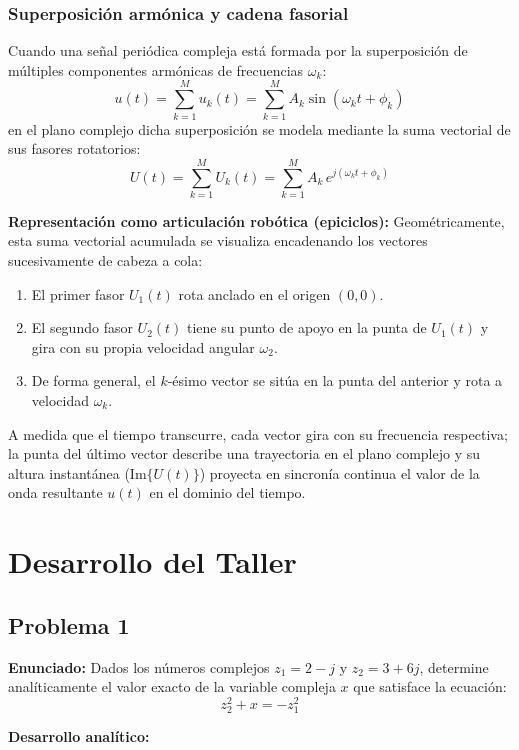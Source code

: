 \documentclass[11pt,a4paper]{article}
\begin{document}
\subsubsection{Superposición armónica y cadena fasorial}
Cuando una señal periódica compleja está formada por la superposición de múltiples componentes armónicas de frecuencias $\omega_k$:
\[
u(t) = \sum_{k=1}^M u_k(t) = \sum_{k=1}^M A_k \sin(\omega_k t + \phi_k)
\]
en el plano complejo dicha superposición se modela mediante la suma vectorial de sus fasores rotatorios:
\[
U(t) = \sum_{k=1}^M U_k(t) = \sum_{k=1}^M A_k \, e^{j(\omega_k t + \phi_k)}
\]

\textbf{Representación como articulación robótica (epiciclos):}
Geométricamente, esta suma vectorial acumulada se visualiza encadenando los vectores sucesivamente de cabeza a cola:
\begin{enumerate}
    \item El primer fasor $U_1(t)$ rota anclado en el origen $(0,0)$.
    \item El segundo fasor $U_2(t)$ tiene su punto de apoyo en la punta de $U_1(t)$ y gira con su propia velocidad angular $\omega_2$.
    \item De forma general, el $k$-ésimo vector se sitúa en la punta del anterior y rota a velocidad $\omega_k$.
\end{enumerate}
A medida que el tiempo transcurre, cada vector gira con su frecuencia respectiva; la punta del último vector describe una trayectoria en el plano complejo y su altura instantánea ($\text{Im}\{U(t)\}$) proyecta en sincronía continua el valor de la onda resultante $u(t)$ en el dominio del tiempo.


\section{Desarrollo del Taller}

\subsection{Problema 1}
\noindent\textbf{Enunciado:} Dados los números complejos $z_1 = 2 - j$ y $z_2 = 3 + 6j$, determine analíticamente el valor exacto de la variable compleja $x$ que satisface la ecuación:
\[
z_2^2 + x = -z_1^2
\]

\noindent\textbf{Desarrollo analítico:}
\end{document}
